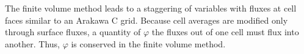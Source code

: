 The finite volume method leads to a staggering of variables with fluxes at cell faces similar to an Arakawa C grid.  Because cell averages are modified only through surface fluxes, a quantity of $\varphi$ the fluxes out of one cell must flux into another.  Thus, $\varphi$ is conserved in the finite volume method.


